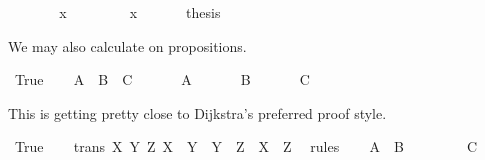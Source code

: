 \begin{isabellebody}
\isanewline
\ \ \isamarkupfalse%
\ \isamarkupfalse%
\ {\isachardoublequote}{\isasymdots}\ {\isacharless}\ x{}{\isachardoublequote}\ \isamarkupfalse%
\isanewline
\ \ \isamarkupfalse%
\ \isamarkupfalse%
\ {\isachardoublequote}{\isasymdots}\ {\isacharequal}\ x{}{\isachardoublequote}\ \isamarkupfalse%
\isanewline
\ \ \isamarkupfalse%
\ \isamarkupfalse%
\ {\isacharquery}thesis\ \isamarkupfalse%
\isacommand{{\isachardot}}\isanewline
\isamarkupfalse%
\isamarkupfalse%
%
\begin{isamarkuptext}%
We may also calculate on propositions.%
\end{isamarkuptext}%
\isamarkuptrue%
\ True\isanewline
\isamarkupfalse%
\isanewline
\ \ \isamarkupfalse%
\ {\isachardoublequote}A\ {\isasymlongrightarrow}\ B\ {\isasymlongrightarrow}\ C{\isachardoublequote}\ \isamarkupfalse%
\isanewline
\ \ \isamarkupfalse%
\ \isamarkupfalse%
\ A\ \isamarkupfalse%
\isanewline
\ \ \isamarkupfalse%
\ \isamarkupfalse%
\ B\ \isamarkupfalse%
\isanewline
\ \ \isamarkupfalse%
\ \isamarkupfalse%
\ C\ \isamarkupfalse%
\isacommand{{\isachardot}}\isanewline
\isamarkupfalse%
\isamarkupfalse%
%
\begin{isamarkuptext}%
This is getting pretty close to Dijkstra's preferred proof style.%
\end{isamarkuptext}%
\isamarkuptrue%
\ True\isanewline
\isamarkupfalse%
\isanewline
\ \ \isamarkupfalse%
\ {\isacharbrackleft}trans{\isacharbrackright}{\isacharcolon}\ {\isachardoublequote}{\isasymAnd}X\ Y\ Z{\isachardot}\ X\ {\isasymlongrightarrow}\ Y\ {\isasymLongrightarrow}\ Y\ {\isasymlongrightarrow}\ Z\ {\isasymLongrightarrow}\ X\ {\isasymlongrightarrow}\ Z{\isachardoublequote}\ \isamarkupfalse%
\ rules\isanewline
\ \ \isamarkupfalse%
\ {\isachardoublequote}A\ {\isasymlongrightarrow}\ B{\isachardoublequote}\ \isamarkupfalse%
\isanewline
\ \ \isamarkupfalse%
\ \isamarkupfalse%
\ {\isachardoublequote}{\isasymdots}\ {\isasymlongrightarrow}\ C{\isachardoublequote}\ \isamarkupfalse%
\isanewline
\ \ \isamarkupfalse%

\end{isabellebody}
